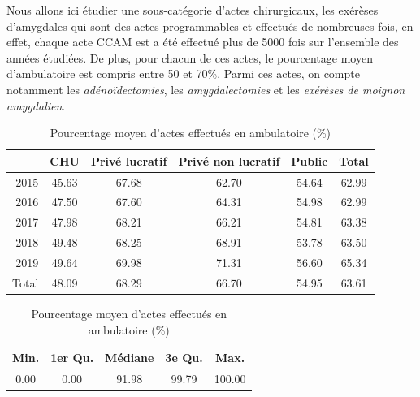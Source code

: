 Nous allons ici étudier une sous-catégorie d'actes chirurgicaux, les exérèses d'amygdales qui sont des actes programmables et effectués de nombreuses fois, en effet, chaque acte CCAM est a été effectué plus de 5000 fois sur l'ensemble des années étudiées. De plus, pour chacun de ces actes, le pourcentage moyen d'ambulatoire est compris entre 50 et 70\%. Parmi ces actes, on compte notamment les \textit{adénoïdectomies}, les \textit{amygdalectomies} et les \textit{exérèses de moignon amygdalien}.\\

\begin{table}[ht]
\centering
\caption{Pourcentage moyen d'actes effectués en ambulatoire (\%)} 
\label{part_ambu_tabu_amy}
\begin{tabular}{r|cccc|c}
  \hline
 & CHU & Privé lucratif & Privé non lucratif & Public & Total \\ 
  \hline
2015 & 45.63 & 67.68 & 62.70 & 54.64 & 62.99 \\ 
  2016 & 47.50 & 67.60 & 64.31 & 54.98 & 62.99 \\ 
  2017 & 47.98 & 68.21 & 66.21 & 54.81 & 63.38 \\ 
  2018 & 49.48 & 68.25 & 68.91 & 53.78 & 63.50 \\ 
  2019 & 49.64 & 69.98 & 71.31 & 56.60 & 65.34 \\ 
  \hline
  Total & 48.09 & 68.29 & 66.70 & 54.95 & 63.61 \\ 
   \hline
\end{tabular}

\bigskip

\begin{tabular}{ccccc}
  \hline
Min. & 1er Qu. & Médiane & 3e Qu. & Max. \\ 
  \hline
0.00 & 0.00 & 91.98 & 99.79 & 100.00  \\ 
   \hline
\end{tabular}
\end{table}


